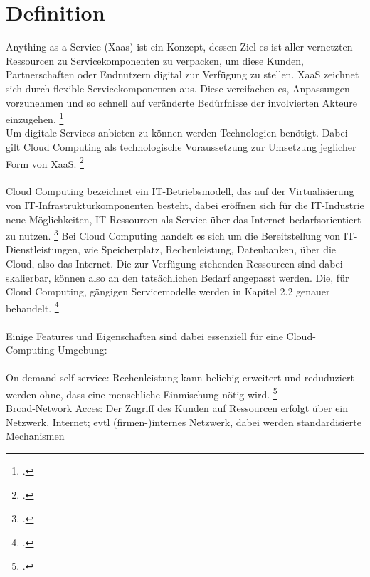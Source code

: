 \documentclass[12pt,toc=bib,toc=listof]{scrreprt}
\begin{document}
\section{Definition} %
\label{sec:Definition}

Anything as a Service (Xaas) ist ein Konzept, dessen Ziel es ist aller vernetzten Ressourcen zu Servicekomponenten zu verpacken, um diese Kunden, Partnerschaften 
oder Endnutzern digital zur Verfügung zu stellen. XaaS zeichnet sich durch flexible Servicekomponenten aus. Diese vereifachen es, Anpassungen vorzunehmen
und so schnell auf veränderte Bedürfnisse der involvierten Akteure einzugehen. \footcite [Vgl.] [] {Riasanow.2020}
\\ 
Um digitale Services anbieten zu können werden Technologien benötigt. Dabei gilt Cloud Computing als technologische Voraussetzung zur Umsetzung jeglicher
Form von XaaS. \footcite [Vgl.] [] {Riasanow.2020}
 \\ \\
Cloud Computing bezeichnet ein IT-Betriebsmodell, das auf der Virtualisierung von IT-Infrastrukturkomponenten besteht, dabei eröffnen 
 sich für die IT-Industrie neue Möglichkeiten, IT-Ressourcen als Service über das Internet bedarfsorientiert zu nutzen. \footcite [Vgl.] [] {Froschle.2014}
Bei Cloud Computing handelt es sich um die Bereitstellung von IT-Dienstleistungen, wie 
Speicherplatz, Rechenleistung, Datenbanken, über die Cloud, also das Internet. 
Die zur Verfügung stehenden Ressourcen sind dabei skalierbar, können also an den tatsächlichen Bedarf angepasst werden. Die, für Cloud Computing, gängigen Servicemodelle werden
in Kapitel 2.2 genauer behandelt. \footcite [Vgl.] [] {Riasanow.2020}
\\ \\
Einige Features und Eigenschaften sind dabei essenziell für eine Cloud-Computing-Umgebung: 
\\ \\
On-demand self-service: Rechenleistung kann beliebig erweitert und reduduziert werden ohne, 
dass eine menschliche Einmischung nötig wird. \footcite [Vgl.] []{Dangelo.2015} \\
Broad-Network Acces: Der Zugriff des Kunden auf Ressourcen erfolgt über ein Netzwerk, Internet; evtl (firmen-)internes Netzwerk, dabei werden standardisierte Mechanismen 
\end{document}

